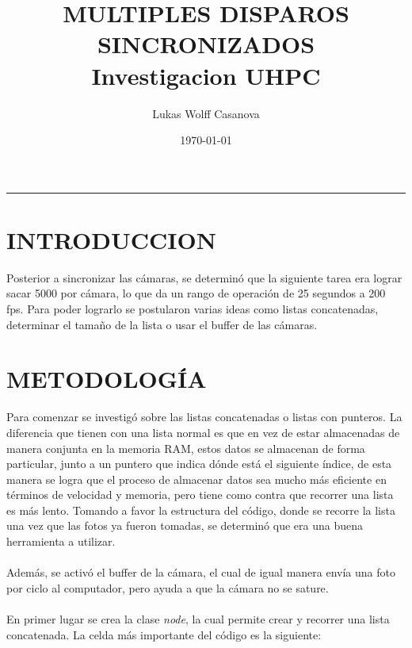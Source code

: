 \documentclass{article}
\title{\textbf{MULTIPLES DISPAROS SINCRONIZADOS}\\[0.5em] \large Investigacion UHPC}
\author{Lukas Wolff Casanova}
\date{\today}
\begin{document}
\maketitle
\hrule

\section{INTRODUCCION}

\noindent Posterior a sincronizar las cámaras, se determinó que la siguiente tarea era lograr sacar 5000 por cámara, lo que da un rango de operación de 25 segundos a 
200 fps. Para poder lograrlo se postularon varias ideas como listas concatenadas, determinar el tamaño de la lista o usar el buffer de las cámaras.

\section{METODOLOGÍA}

\noindent Para comenzar se investigó sobre las listas concatenadas o listas con punteros. La diferencia que tienen con una lista normal es que en vez de estar
almacenadas de manera conjunta en la memoria RAM, estos datos se almacenan de forma particular, junto a un puntero que indica dónde está el siguiente
índice, de esta manera se logra que el proceso de almacenar datos sea mucho más eficiente en términos de velocidad y memoria, pero tiene como contra que recorrer 
una lista es más lento. Tomando a favor la estructura del código, donde se recorre la lista una vez que las fotos ya fueron tomadas, se determinó que era una
buena herramienta a utilizar.
\\ \\
Además, se activó el buffer de la cámara, el cual de igual manera envía una foto por ciclo al computador, pero ayuda a que la cámara no se sature.
\\ \\
En primer lugar se crea la clase \textit{node}, la cual permite crear y recorrer una lista concatenada. La celda más importante del 
código es la siguiente:
\end{document}
